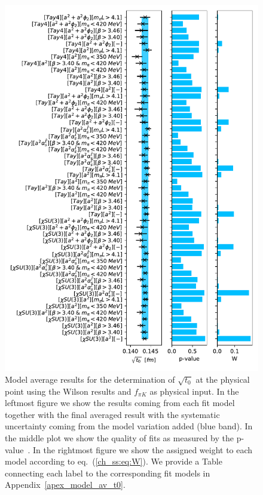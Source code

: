\begin{figure}
    \centering
    \includegraphics[width=1.\textwidth]{./cap5/figs/BMA_w.pdf}
    \caption{Model average results for the determination of $\sqrt{t_0}$ at the physical point using the Wilson results and $f_{\pi K}$ as physical input. In the leftmost figure we show the results coming from each fit model together with the final averaged result with the systematic uncertainty coming from the model variation added (blue band). In the middle plot we show the quality of fits as measured by the p-value~\citep{Bruno:2022mfy}. In the rightmost figure we show the assigned weight to each model according to eq.~(\ref{ch_ss:eq:W}). We provide a Table connecting each label to the corresponding fit models in Appendix~\ref{apex_model_av_t0}.}
    \label{ch_ss:fig:BMA_w}
\end{figure}

